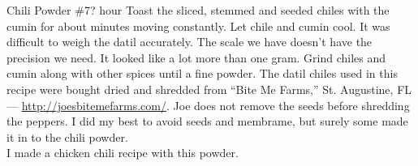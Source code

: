 \begin{recipe}{Chili Powder \#7}{?}{ hour}
Toast the sliced, stemmed and seeded chiles with the cumin for about \unit[3--4]{minutes} moving constantly.  Let chile and cumin cool.
\freeform It was difficult to weigh the datil accurately.  The scale we have doesn't have the precision we need.  It looked like a lot more than one gram.
Grind chiles and cumin along with other spices until a fine powder.
\freeform The datil chiles used in this recipe were bought dried and shredded from ``Bite Me Farms,'' St. Augustine, FL --- \url{http://joesbitemefarms.com/}. Joe does not remove the seeds before shredding the peppers.  I did my best to avoid seeds and membrame, but surely some made it in to the chili powder.\\
I made a chicken chili recipe with this powder.
\end{recipe}
